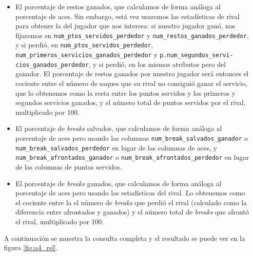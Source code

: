 \begin{itemize}
\item El porcentaje de restos ganados, que calculamos de forma análoga al porcentaje de aces. Sin embargo, está vez usaremos las estadísticas de rival para obtener la del jugador que nos interesa: si nuestro jugador ganó, nos fijaremos en \texttt{num\_ptos\_servidos\_perdedor} y \texttt{num\_restos\_ganados\_perdedor}, y si perdió, en \texttt{num\_ptos\_servidos\_perdedor}, \texttt{num\_primeros\_servicios\_ganados\_perdedor} y \texttt{p.num\_segundos\_servi-} \\ \texttt{cios\_ganados\_perdedor}, y si perdió, en los mismos atributos pero del ganador. El porcentaje de restos ganados por nuestro jugador será entonces el cociente entre el número de saques que su rival no consiguió ganar el servicio, que lo obtenemos como la resta entre los puntos servidos y los primeros y segundos servicios ganados, y el número total de puntos servidos por el rival, multiplicado por 100.
\item El porcentaje de \textit{breaks} salvados, que calculamos de forma análoga al porcentaje de aces pero usando las columnas \texttt{num\_break\_salvados\_ganador} o \texttt{num\_break\_salvados\_perdedor} en lugar de las columnas de aces, y \texttt{num\_break\_afrontados\_ganador} o \texttt{num\_break\_afrontados\_perdedor} en lugar de las columnas de puntos servidos.
\item El porcentaje de \textit{breaks} ganados, que calculamos de forma análoga al porcentaje de aces pero usando las estadísticas del rival. Lo obtenemos como el cociente entre la el número de \textit{breaks} que perdió el rival (calculado como la diferencia entre afrontados y ganados) y el número total de \textit{breaks} que afrontó el rival, multiplicado por 100.
\end{itemize}

\noindent A continuación se muestra la consulta completa y el resultado se puede ver en la figura \ref{fig:q4_rel}.

